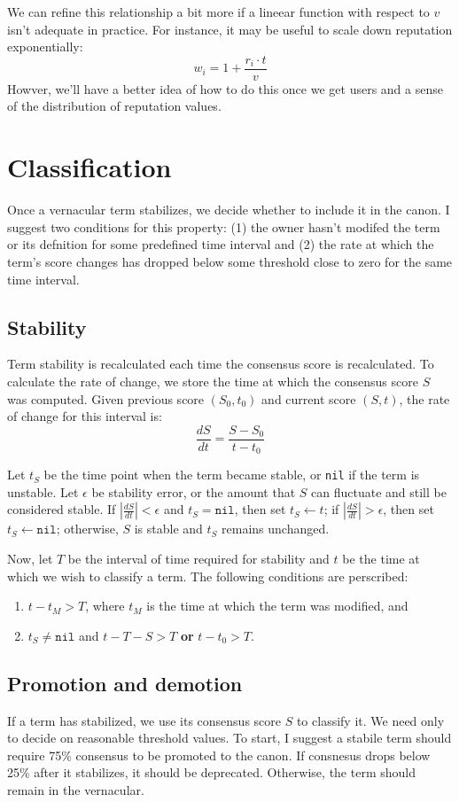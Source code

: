 \documentclass[letter]{article}
\begin{document}
We can refine this relationship a bit more if a lineear function with respect to $v$ isn't adequate
in practice. For instance, it may be useful to scale down reputation exponentially: 
$$ w_i = 1 + \frac{r_i \cdot t}{v} $$
Howver, we'll have a better idea of how to do this once we get users and a sense of the distribution 
of reputation values. 

\section{Classification}
Once a vernacular term stabilizes, we decide whether to include it in the canon. I suggest two 
conditions for this property: (1) the owner hasn't modifed the term or its defnition for some 
predefined time interval and (2) the rate at which the term's score changes has dropped below some
threshold close to zero for the same time interval. 

\subsection{Stability}
Term stability is recalculated each time the consensus score is recalculated. 
To calculate the rate of change, we store the time at which the consensus score $S$ was computed. 
Given previous score $(S_0, t_0)$ and current score $(S, t)$, the rate of change for this 
interval is: 
$$ \frac{dS}{dt} = \frac{S - S_0}{t - t_0} $$

Let $t_S$ be the time point when the term became stable, or \texttt{nil} if the term is unstable. 
Let $\epsilon $ be stability error, or the amount that $S$ can fluctuate and still be considered 
stable. If $| \frac{dS}{dt} | < \epsilon $ and $t_S = \texttt{nil}$, then set $t_S \leftarrow t$; 
if $| \frac{dS}{dt} | > \epsilon$, then set $t_S \leftarrow \texttt{nil}$; otherwise, $S$ is 
stable and $t_S$ remains unchanged.

Now, let $T$ be the interval of time required for stability and $t$ be the time at which we 
wish to classify a term. The following conditions are perscribed: 
\begin{enumerate}
\item $t - t_M > T$, where $t_M$ is the time at which the term was modified, and 
\item $t_S \ne \texttt{nil}$ and $t - T-S > T$ \textbf{or} $t - t_0 > T$.
\end{enumerate}

\subsection{Promotion and demotion}
If a term has stabilized, we use its consensus score $S$ to classify it. 
We need only to decide on reasonable threshold values. To start, I suggest a stabile term should 
require 75\% consensus to be promoted to the canon. If consnesus drops below 25\% after it stabilizes, 
it should be deprecated. Otherwise, the term should remain in the vernacular. 
\end{document}
